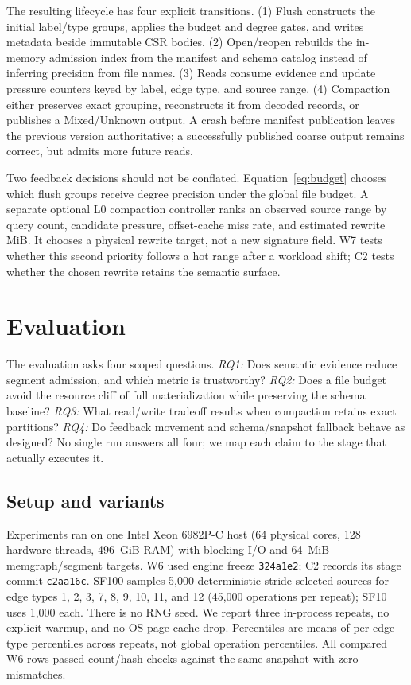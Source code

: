 \documentclass[sigconf,screen]{cidr-2027}
\begin{document}
The resulting lifecycle has four explicit transitions. (1) Flush constructs
the initial label/type groups, applies the budget and degree gates, and writes
metadata beside immutable CSR bodies. (2) Open/reopen rebuilds the in-memory
admission index from the manifest and schema catalog instead of inferring
precision from file names. (3) Reads consume evidence and update pressure
counters keyed by label, edge type, and source range. (4) Compaction either
preserves exact grouping, reconstructs it from decoded records, or publishes a
Mixed/Unknown output. A crash before manifest publication leaves the previous
version authoritative; a successfully published coarse output remains
correct, but admits more future reads.

Two feedback decisions should not be conflated. Equation~\ref{eq:budget}
chooses which flush groups receive degree precision under the global file
budget. A separate optional L0 compaction controller ranks an observed source
range by query count, candidate pressure, offset-cache miss rate, and estimated
rewrite MiB. It chooses a physical rewrite target, not a new signature field.
W7 tests whether this second priority follows a hot range after a workload
shift; C2 tests whether the chosen rewrite retains the semantic surface.

\section{Evaluation}

The evaluation asks four scoped questions. \emph{RQ1:} Does semantic evidence
reduce segment admission, and which metric is trustworthy? \emph{RQ2:} Does a
file budget avoid the resource cliff of full materialization while preserving
the schema baseline? \emph{RQ3:} What read/write tradeoff results when
compaction retains exact partitions? \emph{RQ4:} Do feedback movement and
schema/snapshot fallback behave as designed? No single run answers all four;
we map each claim to the stage that actually executes it.

\subsection{Setup and variants}

Experiments ran on one Intel Xeon 6982P-C host (64 physical cores, 128 hardware
threads, 496~GiB RAM) with blocking I/O and 64~MiB memgraph/segment targets.
W6 used engine freeze \texttt{324a1e2}; C2 records its stage commit
\texttt{c2aa16c}. SF100 samples 5,000 deterministic stride-selected sources
for edge types 1, 2, 3, 7, 8, 9, 10, 11, and 12 (45,000 operations per repeat);
SF10 uses 1,000 each. There is no RNG seed. We report three in-process repeats,
no explicit warmup, and no OS page-cache drop. Percentiles are means of
per-edge-type percentiles across repeats, not global operation percentiles.
All compared W6 rows passed count/hash checks against the same snapshot with
zero mismatches.
\end{document}
